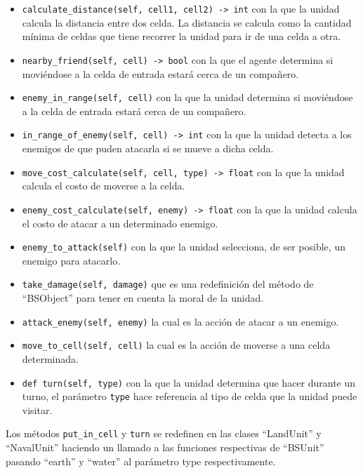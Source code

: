 \begin{itemize}
	\item \verb|calculate_distance(self, cell1, cell2) -> int| con la que la unidad calcula la distancia entre dos celda. La distancia se calcula como la cantidad m\'inima de celdas que tiene recorrer la unidad para ir de una celda a otra.
	\item \verb|nearby_friend(self, cell) -> bool| con la que el agente determina si movi\'endose a la celda de entrada estar\'a cerca de un compa\~{n}ero.
	\item \verb|enemy_in_range(self, cell)| con la que la unidad determina si movi\'endose a la celda de entrada estar\'a cerca de un compa\~{n}ero.
	\item \verb|in_range_of_enemy(self, cell) -> int| con la que la unidad detecta a los enemigos de que puden atacarla si se mueve a dicha celda.
	\item \verb|move_cost_calculate(self, cell, type) -> float| con la que la unidad calcula el costo de moverse a la celda.
	\item\verb|enemy_cost_calculate(self, enemy) -> float| con la que la unidad calcula el costo de atacar a un determinado enemigo.
	\item \verb|enemy_to_attack(self)| con la que la unidad selecciona, de ser posible, un enemigo para atacarlo.
	\item \verb|take_damage(self, damage)| que es una redefinici\'on del m\'etodo de ``BSObject'' para tener en cuenta la moral de la unidad.
	\item \verb|attack_enemy(self, enemy)| la cual es la acci\'on de atacar a un enemigo.
	\item \verb|move_to_cell(self, cell)| la cual es la acci\'on de moverse a una celda determinada.
	\item \verb|def turn(self, type)| con la que la unidad determina que hacer durante un turno, el par\'ametro \verb|type| hace referencia al tipo de celda que la unidad puede visitar.
\end{itemize}

Los m\'etodos \verb|put_in_cell| y \verb|turn| se redefinen en las clases ``LandUnit'' y ``NavalUnit'' haciendo un llamado a las funciones respectivas de ``BSUnit'' pasando ``earth'' y ``water'' al par\'ametro type respectivamente.

